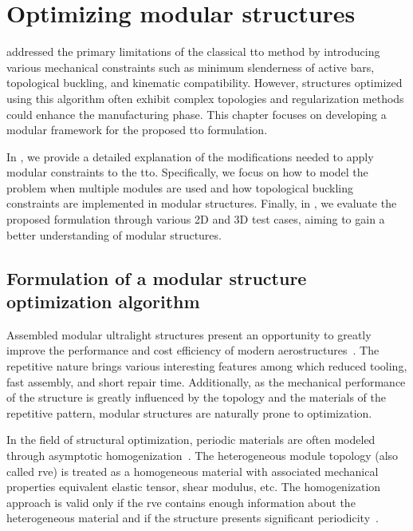 \setchapterpreamble[u]{\margintoc}
\glsresetall %
\chapter{Optimizing modular structures} \label{chap:05}
 addressed the primary limitations of the classical \gls{tto} method by introducing various mechanical constraints such as minimum slenderness of active bars, topological buckling, and kinematic compatibility. However, structures optimized using this algorithm often exhibit complex topologies and regularization methods could enhance the manufacturing phase. This chapter focuses on developing a modular framework for the proposed \gls{tto} formulation.

In , we provide a detailed explanation of the modifications needed to apply modular constraints to the \gls{tto}. Specifically, we focus on how to model the problem when multiple modules are used and how topological buckling constraints are implemented in modular structures. Finally, in , we evaluate the proposed formulation through various 2D and 3D test cases, aiming to gain a better understanding of modular structures.

\section{Formulation of a modular structure optimization algorithm} \label{sec:05_01}
Assembled modular ultralight structures present an opportunity to greatly improve the performance and cost efficiency of modern aerostructures~. The repetitive nature brings various interesting features among which reduced tooling, fast assembly, and short repair time. Additionally, as the mechanical performance of the structure is greatly influenced by the topology and the materials of the repetitive pattern, modular structures are naturally prone to optimization.

In the field of structural optimization, periodic materials are often modeled through asymptotic homogenization~. The heterogeneous module topology (also called \gls{rve}) is treated as a homogeneous material with associated mechanical properties \ie equivalent elastic tensor, shear modulus, etc. The homogenization approach is valid only if the \gls{rve} contains enough information about the heterogeneous material and if the structure presents significant periodicity~. 

